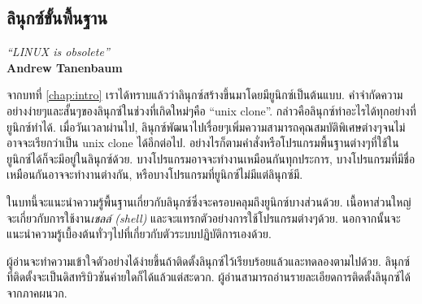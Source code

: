 \begin{thwbr}
\chapter{ลินุกซ์ขั้นพื้นฐาน}\label{chap:basic}

\begin{flushright}
{\it\latintext ``LINUX is obsolete''}\\
{\bf\latintext Andrew Tanenbaum }
\end{flushright}


จากบทที่ \ref{chap:intro} เราได้ทราบแล้วว่าลินุกซ์สร้างขึ้นมาโดยมียูนิกซ์เป็นต้นแบบ. คำจำกัดความอย่างง่ายๆและสั้นๆของลินุกซ์ในช่วงที่เกิดใหม่ๆคือ ``unix clone''. กล่าวคือลินุกซ์ทำอะไรได้ทุกอย่างที่ยูนิกซ์ทำได้. เมื่อวันเวลาผ่านไป, ลินุกซ์พัฒนาไปเรื่อยๆเพิ่มความสามารถคุณสมบัติพิเศษต่างๆจนไม่อาจจะเรียกว่าเป็น unix clone ได้อีกต่อไป. อย่างไรก็ตามคำสั่งหรือโปรแกรมพื้นฐานต่างๆที่ใช้ในยูนิกซ์ได้ก็จะมีอยู่ในลินุกซ์ด้วย. บางโปรแกรมอาจจะทำงานเหมือนกันทุกประการ, บางโปรแกรมที่มีชื่อเหมือนกันอาจจะทำงานต่างกัน, หรือบางโปรแกรมที่ยูนิกซ์ไม่มีแต่ลินุกซ์มี.

ในบทนี้จะแนะนำความรู้พื้นฐานเกี่ยวกับลินุกซ์ซึ่งจะครอบคลุมถึงยูนิกซ์บางส่วนด้วย. เนื้อหาส่วนใหญ่จะเกี่ยวกับการใช้งาน\emph{เชลล์ (shell)} และจะแทรกตัวอย่างการใช้โปรแกรมต่างๆด้วย. นอกจากนั้นจะแนะนำความรู้เบื้องต้นทั่วๆไปที่เกี่ยวกับตัวระบบปฏิบัติการเองด้วย.

ผู้อ่านจะทำความเข้าใจตัวอย่างได้ง่ายขึ้นถ้าติดตั้งลินุกซ์ไว้เรียบร้อยแล้วและทดลองตามไปด้วย. ลินุกซ์ที่ติดตั้งจะเป็นดิสทริบิวชันค่ายใดก็ได้แล้วแต่สะดวก. ผู้อ่านสามารถอ่านรายละเอียดการติดตั้งลินุกซ์ได้จากภาคผนวก. 


\end{thwbr}
